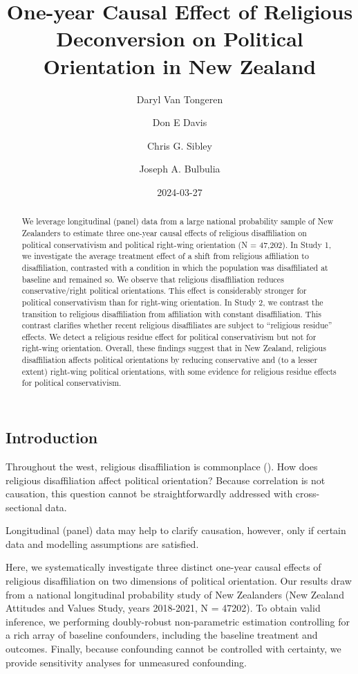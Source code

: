 \documentclass[
  singlecolumn]{article}
\title{One-year Causal Effect of Religious Deconversion on Political
Orientation in New Zealand}
\author{Daryl Van Tongeren \and Don E Davis \and Chris G.
Sibley \and Joseph A. Bulbulia}
\date{2024-03-27}
\begin{document}
\maketitle
\begin{abstract}
We leverage longitudinal (panel) data from a large national probability
sample of New Zealanders to estimate three one-year causal effects of
religious disaffiliation on political conservativism and political
right-wing orientation (N = 47,202). In Study 1, we investigate the
average treatment effect of a shift from religious affiliation to
disaffiliation, contrasted with a condition in which the population was
disaffiliated at baseline and remained so. We observe that religious
disaffiliation reduces conservative/right political orientations. This
effect is considerably stronger for political conservativism than for
right-wing orientation. In Study 2, we contrast the transition to
religious disaffiliation from affiliation with constant disaffiliation.
This contrast clarifies whether recent religious disaffiliates are
subject to ``religious residue'' effects. We detect a religious residue
effect for political conservativism but not for right-wing orientation.
Overall, these findings suggest that in New Zealand, religious
disaffiliation affects political orientations by reducing conservative
and (to a lesser extent) right-wing political orientations, with some
evidence for religious residue effects for political conservativism.
\end{abstract}

\subsection{Introduction}\label{introduction}

Throughout the west, religious disaffiliation is commonplace
(). How
does religious disaffiliation affect political orientation? Because
correlation is not causation, this question cannot be straightforwardly
addressed with cross-sectional data.

Longitudinal (panel) data may help to clarify causation, however, only
if certain data and modelling assumptions are satisfied.

Here, we systematically investigate three distinct one-year causal
effects of religious disaffiliation on two dimensions of political
orientation. Our results draw from a national longitudinal probability
study of New Zealanders (New Zealand Attitudes and Values Study, years
2018-2021, N = 47202). To obtain valid inference, we performing
doubly-robust non-parametric estimation controlling for a rich array of
baseline confounders, including the baseline treatment and outcomes.
Finally, because confounding cannot be controlled with certainty, we
provide sensitivity analyses for unmeasured confounding.
\end{document}

